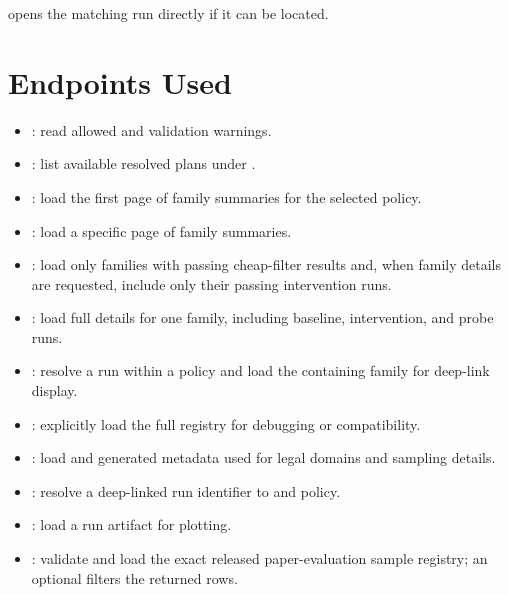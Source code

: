 \documentclass[11pt]{article}
\begin{document}
opens the matching run directly if it can be located.

\section*{Endpoints Used}

\begin{itemize}
\item {}: read allowed \termSimulators and validation warnings.
\item {}: list available resolved plans under .
\item {}: load the first page of family summaries for the selected policy.
\item {}: load a specific page of family summaries.
\item {}: load only families with passing cheap-filter results and, when family details are requested, include only their passing intervention runs.
\item {}: load full details for one family, including baseline, intervention, and probe runs.
\item {}: resolve a run within a policy and load the containing family for deep-link display.
\item {}: explicitly load the full registry for debugging or compatibility.
\item {}: load  and generated metadata used for legal domains and sampling details.
\item {}: resolve a deep-linked run identifier to \termSimulator and policy.
\item {}: load a run artifact for plotting.
\item {}: validate and load the exact released paper-evaluation sample registry; an optional  filters the returned rows.

\end{itemize}
\end{document}
